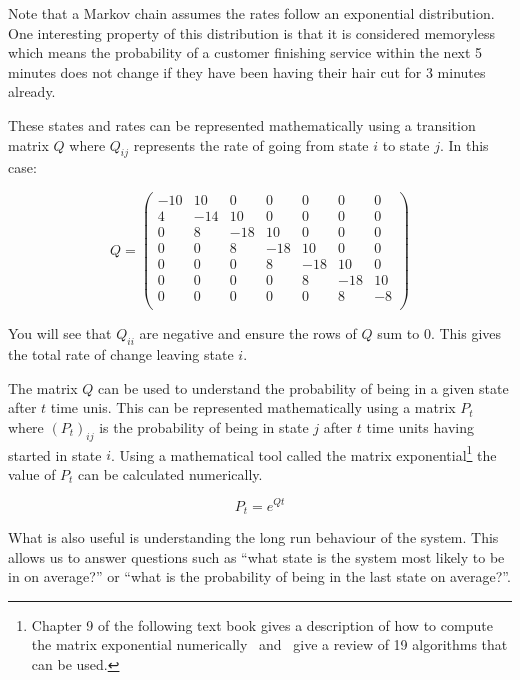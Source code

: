 Note that a Markov chain assumes the rates follow an exponential distribution.
One interesting property of this distribution is that it is considered
memoryless which means the probability of a customer finishing service
within the next 5 minutes does not change if they have been
having their hair cut for 3 minutes already.

These states and rates can be represented mathematically using a transition
matrix \(Q\) where \(Q_{ij}\) represents the rate of going from state \(i\) to
state \(j\). In this case:

\begin{equation}
Q =
\begin{pmatrix}
-10 &  10 &   0 &   0 &   0 &   0 &   0\\
  4 & -14 &  10 &   0 &   0 &   0 &   0\\
  0 &   8 & -18 &  10 &   0 &   0 &   0\\
  0 &   0 &   8 & -18 &  10 &   0 &   0\\
  0 &   0 &   0 &   8 & -18 &  10 &   0\\
  0 &   0 &   0 &   0 &   8 & -18 &  10\\
  0 &   0 &   0 &   0 &   0 &   8 &  -8\\
 \end{pmatrix}
 \label{eqn:barber_shop_transition_matrix}
\end{equation}

You will see that \(Q_{ii}\) are negative and ensure the rows of \(Q\) sum to 0.
This gives the total rate of change leaving state \(i\).

The matrix \(Q\) can be used to understand the probability of being in a given
state after \(t\) time unis. This can be represented mathematically using a
matrix \(P_{t}\) where \((P_{t})_{ij}\) is the probability of being in state \(j\)
after \(t\) time units having started in state \(i\). Using a mathematical tool
called the matrix exponential\footnote{Chapter 9 of the following text book
gives a description of how to compute the matrix exponential
numerically~\cite{van1996matrix} and~\cite{moler1978nineteen,
moler2003nineteen} give a review of 19 algorithms that can be used.} the value
of \(P_{t}\) can be calculated numerically.

\begin{equation}
    P_t = e^{Qt}
    \label{eqn:continuous_time_markov_process_matrix_exponential}
\end{equation}

What is also useful is understanding the long run behaviour of the
system. This allows us to answer questions such as ``what state is the system most
likely to be in on average?'' or ``what is the probability of being in the last
state on average?''.

